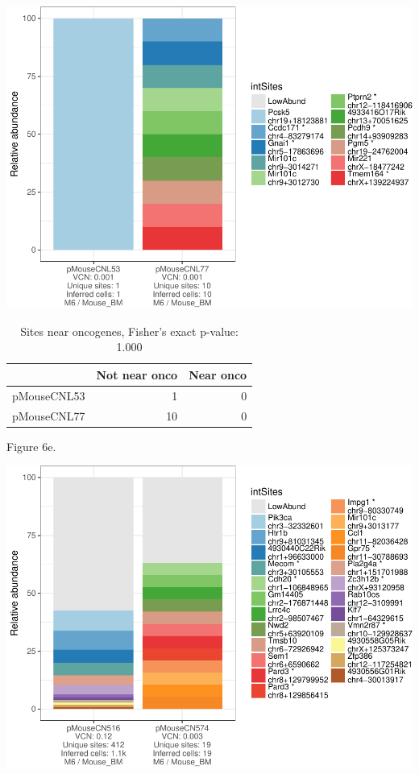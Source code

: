 \documentclass[12pt,]{article}
\begin{document}
\includegraphics{project_files/figure-latex/unnamed-chunk-3-4.pdf}
\vspace{1.0cm}

\begin{table}[!h]

\caption{\label{tab:unnamed-chunk-3}Sites near oncogenes, Fisher's exact p-value: 1.000}
\centering
\begin{tabular}[t]{lrr}
\toprule
  & Not near onco & Near onco\\
\midrule
pMouseCNL53 & 1 & 0\\
pMouseCNL77 & 10 & 0\\
\bottomrule
\end{tabular}
\end{table}

\newpage

Figure 6e.

\includegraphics{project_files/figure-latex/unnamed-chunk-3-5.pdf}
\vspace{1.0cm}
\end{document}
